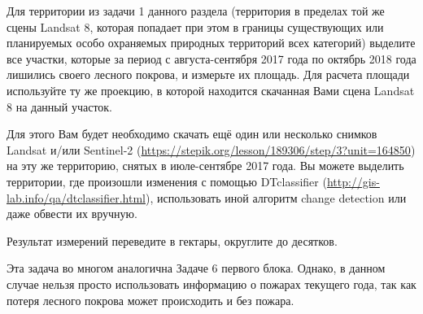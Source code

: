 
Для территории из задачи 1 данного раздела (территория в пределах той же сцены Landsat 8, которая попадает при этом в границы существующих или планируемых особо охраняемых природных территорий всех категорий) выделите все участки, которые за период с августа-сентября 2017 года по октябрь 2018 года лишились своего лесного покрова, и измерьте их площадь. Для расчета площади используйте ту же проекцию, в которой находится скачанная Вами сцена Landsat 8 на данный участок.

Для этого Вам будет необходимо скачать ещё один или несколько снимков Landsat и/или Sentinel-2 (\url{https://stepik.org/lesson/189306/step/3?unit=164850}) на эту же территорию, снятых в июле-сентябре 2017 года. Вы можете выделить территории, где произошли изменения с помощью DTclassifier (\url{http://gis-lab.info/qa/dtclassifier.html}), использовать иной алгоритм change detection или даже обвести их вручную.

Результат измерений переведите в гектары, округлите до десятков.

\explanationSection

Эта задача во многом аналогична Задаче 6 первого блока. Однако, в данном случае нельзя просто использовать информацию о пожарах текущего года, так как потеря лесного покрова может происходить и без пожара.

